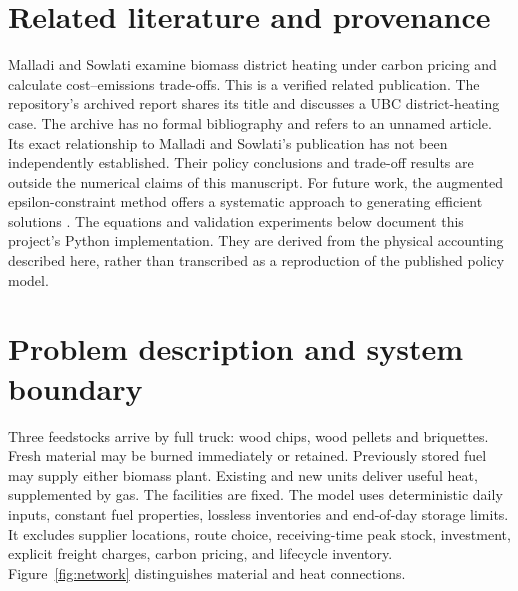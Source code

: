 \documentclass[11pt,a4paper]{article}
\begin{document}
\section{Related literature and provenance}
Malladi and Sowlati \cite{malladi2020} examine biomass district heating under
carbon pricing and calculate cost--emissions trade-offs. This is a verified
related publication. The repository's archived report \cite{historicalreport}
shares its title and discusses a UBC district-heating case. The archive has
no formal bibliography and refers to an unnamed article. Its exact
relationship to Malladi and Sowlati's publication has not been independently
established. Their policy conclusions and trade-off results are outside the
numerical claims of this manuscript. For future work, the augmented epsilon-constraint method offers a
systematic approach to generating efficient solutions \cite{mavrotas2009}.
The equations and validation experiments below document this project's Python
implementation. They are derived from the physical accounting described here,
rather than transcribed as a reproduction of the published policy model.

\section{Problem description and system boundary}
Three feedstocks arrive by full truck: wood chips, wood pellets and briquettes.
Fresh material may be burned immediately or retained. Previously stored fuel
may supply either biomass plant. Existing and new units deliver useful heat,
supplemented by gas. The facilities are fixed. The model uses deterministic
daily inputs, constant fuel properties, lossless inventories and end-of-day
storage limits. It excludes supplier locations, route choice, receiving-time
peak stock, investment, explicit freight charges, carbon pricing, and lifecycle
inventory. Figure~\ref{fig:network} distinguishes material and heat connections.
\end{document}

